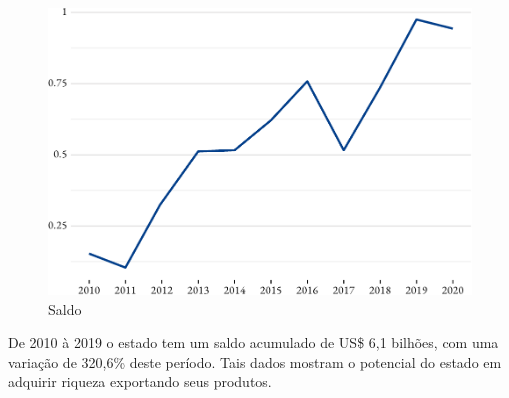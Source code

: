 \begin{figure}[h]
	\caption{Saldo}
	\includegraphics{fig/sal1-1.pdf}
\end{figure}

\par De 2010 à 2019 o estado tem um saldo acumulado de US\$ 6,1 bilhões, com uma variação de 320,6\% deste período. Tais dados mostram o potencial do estado em adquirir riqueza exportando seus produtos. 
